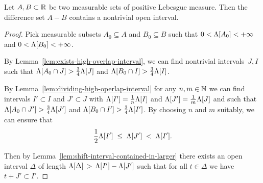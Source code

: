 \begin{lemma}
  \label{lem:different-difference-set-contains-interval}
  Let $A, B \subset \mathbb{R}$ be two measurable sets of positive Lebesgue measure.
  Then the difference set $A - B$ contains a nontrivial open interval.
\end{lemma}
\begin{proof}
  Pick measurable subsets $A_0 \subseteq A$ and $B_0 \subseteq B$ such that
  $0 < \Lambda[A_0] < +\infty$ and $0 < \Lambda[B_0] < +\infty$.

  By Lemma~\ref{lem:exists-high-overlap-interval}, we can find nontrivial intervals~$J, I$
  such that $\Lambda[A_0 \cap J] > \frac{3}{4} \Lambda[J]$
  and $\Lambda[B_0 \cap I] > \frac{3}{4} \Lambda[I]$.

  By Lemma~\ref{lem:dividing-high-operlap-interval}
  for any $n,m \in \mathbb{N}$ we can find intervals
  $I' \subset I$ and $J' \subset J$
  with $\Lambda[I'] = \frac{1}{n} \Lambda[I]$ and $\Lambda[J'] = \frac{1}{m} \Lambda[J]$
  and such that $\Lambda[A_0 \cap J'] > \frac{3}{4} \Lambda[J']$
  and $\Lambda[B_0 \cap I'] > \frac{3}{4} \Lambda[I']$.
  By choosing $n$ and $m$ suitably, we can ensure that
  \begin{align*}
    \frac{1}{2} \Lambda[I'] \; \le \; \Lambda[J'] \; < \; \Lambda[I'] .
  \end{align*}

  Then by Lemma~\ref{lem:shift-interval-contained-in-larger}
  there exists an open interval $\Delta$ of length
  $\Lambda[\Delta] \, > \, \Lambda[I'] - \Lambda[J']$ such that
  for all $t \in \Delta$ we have $t + J' \subset I'$.


\end{proof}

